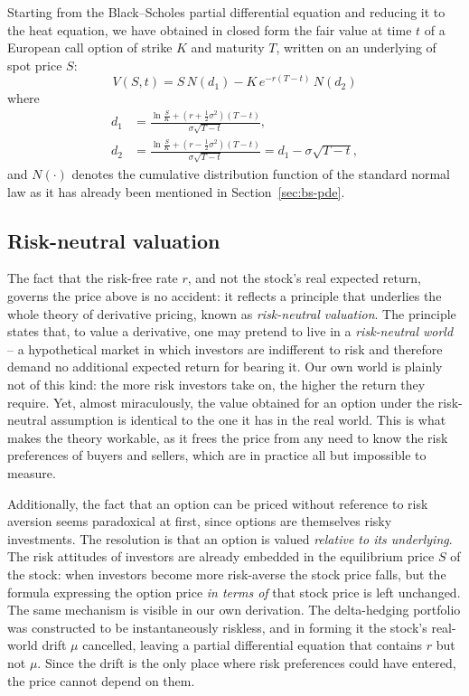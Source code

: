 \documentclass[a4paper,12pt]{article}
\numberwithin{equation}{section}
\begin{document}
Starting from the Black--Scholes partial differential equation and reducing it to
the heat equation, we have obtained in closed form the fair value at time $t$ of a
European call option of strike $K$ and maturity $T$, written on an underlying of
spot price $S$:
\begin{equation}\label{eq:bs-summary}
    V(S,t) = S\,N(d_1) - K\,e^{-r(T-t)}\,N(d_2) 
\end{equation}
where
\begin{align}
  d_1 &= \frac{\ln\frac{S}{K} + \left(r + \tfrac{1}{2}\sigma^2\right)(T-t)}{\sigma\sqrt{T-t}}, \\[4pt]
  d_2 &= \frac{\ln\frac{S}{K} + \left(r - \tfrac{1}{2}\sigma^2\right)(T-t)}{\sigma\sqrt{T-t}}
       = d_1 - \sigma\sqrt{T-t},
\end{align}
and $N(\cdot)$ denotes the cumulative distribution function of the standard normal
law as it has already been mentioned in Section~\ref{sec:bs-pde}.

\subsection*{Risk-neutral valuation}
The fact that the risk-free rate $r$, and not the stock's real expected return, governs the
price above is no accident: it reflects a principle that underlies the whole theory
of derivative pricing, known as \emph{risk-neutral valuation}. The principle states
that, to value a derivative, one may pretend to live in a \emph{risk-neutral world}
-- a hypothetical market in which investors are indifferent to risk and therefore
demand no additional expected return for bearing it. Our own world is plainly not
of this kind: the more risk investors take on, the higher the return they require.
Yet, almost miraculously, the value obtained for an option under the risk-neutral
assumption is identical to the one it has in the real world. This is what makes the
theory workable, as it frees the price from any need to know the risk preferences
of buyers and sellers, which are in practice all but impossible to measure.

Additionally, the fact that an option can be priced without reference to risk aversion seems paradoxical
at first, since options are themselves risky investments. The resolution is that an
option is valued \emph{relative to its underlying}. The risk attitudes of investors
are already embedded in the equilibrium price $S$ of the stock: when investors
become more risk-averse the stock price falls, but the formula expressing the
option price \emph{in terms of} that stock price is left unchanged. The same
mechanism is visible in our own derivation. The delta-hedging portfolio was
constructed to be instantaneously riskless, and in forming it the stock's
real-world drift $\mu$ cancelled, leaving a partial differential equation that
contains $r$ but not $\mu$. Since the drift is the only place where risk preferences
could have entered, the price cannot depend on them.
\end{document}
